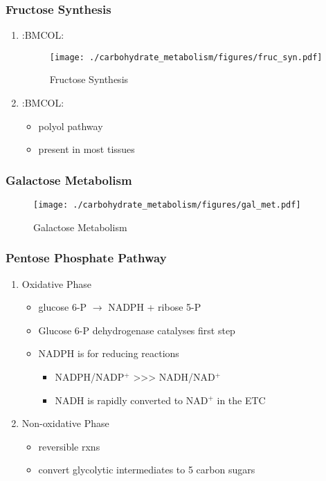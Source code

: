 \documentclass{scrartcl}
\begin{document}
\subsubsection{Fructose Synthesis}
\label{sec:org7dbf759}

\begin{enumerate}
\item :BMCOL:
\label{sec:org7673a6f}
\begin{figure}[htbp]
\centering
\texttt{[image: ./carbohydrate\_metabolism/figures/fruc\_syn.pdf]}
\caption{\label{fig:orgd389339}
Fructose Synthesis}
\end{figure}

\item :BMCOL:
\label{sec:org231c841}
\begin{itemize}
\item polyol pathway
\item present in most tissues
\end{itemize}
\end{enumerate}

\subsubsection{Galactose Metabolism}
\label{sec:orge2b0c96}

\begin{figure}[htbp]
\centering
\texttt{[image: ./carbohydrate\_metabolism/figures/gal\_met.pdf]}
\caption{\label{fig:org81862e1}
Galactose Metabolism}
\end{figure}

\subsubsection{Pentose Phosphate Pathway}
\label{sec:org2c204cb}
\begin{enumerate}
\item Oxidative Phase
\label{sec:org3b36957}
\begin{itemize}
\item glucose 6-P \(\to\) NADPH + ribose 5-P
\item Glucose 6-P dehydrogenase catalyses first step
\item NADPH is for reducing reactions
\begin{itemize}
\item NADPH/NADP\(^{\text{+}}\) \textgreater{}\textgreater{}\textgreater{} NADH/NAD\(^{\text{+}}\)
\item NADH is rapidly converted to NAD\(^{\text{+}}\) in the ETC
\end{itemize}
\end{itemize}
\item Non-oxidative Phase
\label{sec:orga091b30}
\begin{itemize}
\item reversible rxns
\item convert glycolytic intermediates to 5 carbon sugars
\end{itemize}
\end{enumerate}
\end{document}
